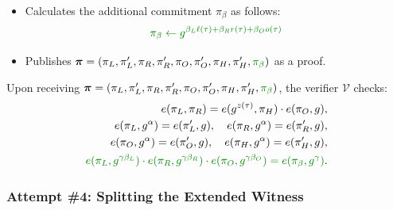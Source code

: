 \documentclass[../lecture-notes-148x210.tex]{subfiles}
\begin{document}
\begin{tcolorbox}
\begin{itemize}[label=]
\begin{align*}
            \pi_L \gets g^{\ell(\tau)}, \quad \pi_L' \gets g^{\alpha \ell(\tau)}, \\
            \pi_R \gets g^{r(\tau)}, \quad \pi_R' \gets g^{\alpha r(\tau)}, \\
            \pi_O \gets g^{o(\tau)}, \quad \pi_O' \gets g^{\alpha o(\tau)}, \\
            \pi_H \gets g^{h(\tau)}, \quad \pi_H' \gets g^{\alpha h(\tau)}.
        \end{align*}
        \item \textcolor{green!50!black}{Calculates the additional commitment $\pi_{\beta}$ as follows:}
        \begin{equation*}
            \textcolor{green!50!black}{\pi_{\beta} \gets g^{\beta_L\ell(\tau) + \beta_Rr(\tau) + \beta_Oo(\tau)}}
        \end{equation*}
        \item Publishes $\boldsymbol{\pi} = (\pi_L,\pi_L',\pi_R,\pi_R',\pi_O,\pi_O',\pi_H,\pi_H',\textcolor{green!50!black}{\pi_{\beta}})$ as a proof.
    \end{itemize}

    \newpage

    Upon receiving $\boldsymbol{\pi} = (\pi_L,\pi_L',\pi_R,\pi_R',\pi_O,\pi_O',\pi_H,\pi_H',\textcolor{green!50!black}{\pi_{\beta}})$, the verifier $\mathcal{V}$ checks:
    \begin{align*}
        e(\pi_L, \pi_R) = e(g^{z(\tau)}, \pi_H) \cdot e(\pi_O, g), \\
        e(\pi_L, g^{\alpha}) = e(\pi_L', g), \quad e(\pi_R, g^{\alpha}) = e(\pi_R', g), \\
        e(\pi_O, g^{\alpha}) = e(\pi_O', g), \quad e(\pi_H, g^{\alpha}) = e(\pi_H', g), \\
        \textcolor{green!50!black}{e(\pi_L, g^{\gamma\beta_L}) \cdot e(\pi_R, g^{\gamma\beta_R}) \cdot e(\pi_O, g^{\gamma\beta_O}) = e(\pi_{\beta}, g^{\gamma})}.
    \end{align*}
\end{tcolorbox}

\subsubsection{Attempt \#4: Splitting the Extended Witness}
\end{document}
